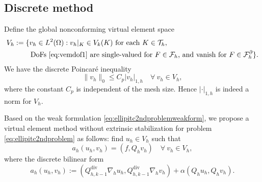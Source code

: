 \documentclass[10pt]{amsart}
\renewcommand{\div}{\operatorname{div}}
\numberwithin{equation}{section}
\begin{document}
\subsection{Discrete method}
Define the global nonconforming virtual element space
\begin{align*}
V_h&:=\{v_h\in L^2(\Omega): v_h|_K\in V_k(K) \textrm{ for each } K\in\mathcal T_h, \textrm{  } \\
&\qquad\; \textrm{DoFs \eqref{eq:vemdof1} are single-valued for $F\in\mathcal F_h$, and vanish for $F\in \mathcal F_h^{\partial}$}\}.
\end{align*}
We have the discrete Poincar\'e inequality \cite{Brenner2003}%
\begin{equation}\label{eq:vempoincareineqlty}
\|v_h\|_0\leq C_p |v_h|_{1,h} \quad\forall~v_h\in V_h,
\end{equation}
where the constant $C_p$ is independent of the mesh size.
Hence $|\cdot|_{1,h}$ is indeed a norm for $V_h$.

Based on the weak formulation \eqref{eq:ellipitc2ndproblemweakform}, we propose a virtual element method without extrinsic stabilization for problem \eqref{eq:ellipitc2ndproblem} as follows: find $u_h\in V_h$ such that
\begin{equation}\label{eq:vem}
a_h(u_h, v_h)=(f, Q_hv_h)\quad\forall~v_h\in V_h,
\end{equation}
where the discrete bilinear form 
\[
a_h(u_h, v_h):=(Q_{h,k-1}^{\div}\nabla_h u_h, Q_{h,k-1}^{\div}\nabla_h v_h)+\alpha(Q_hu_h, Q_hv_h).
\]
\end{document}
